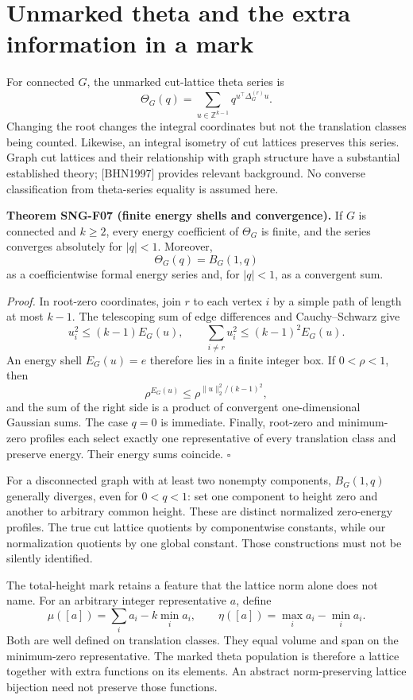 \documentclass[
  11pt,
  a4paper,
]{report}
\begin{document}
\hypertarget{unmarked-theta-and-the-extra-information-in-a-mark}{%
\section{Unmarked theta and the extra information in a
mark}\label{unmarked-theta-and-the-extra-information-in-a-mark}}

For connected \(G\), the unmarked cut-lattice theta series is \[
\Theta_G(q)=\sum_{u\in\mathbb Z^{k-1}}
q^{u^\top\Delta_G^{(r)}u}.
\] Changing the root changes the integral coordinates but not the
translation classes being counted. Likewise, an integral isometry of cut
lattices preserves this series. Graph cut lattices and their
relationship with graph structure have a substantial established theory;
{[}BHN1997{]} provides relevant background. No converse classification
from theta-series equality is assumed here.

\textbf{Theorem SNG-F07 (finite energy shells and convergence).} If
\(G\) is connected and \(k\ge2\), every energy coefficient of
\(\Theta_G\) is finite, and the series converges absolutely for
\(|q|<1\). Moreover, \[
\Theta_G(q)=B_G(1,q)
\] as a coefficientwise formal energy series and, for \(|q|<1\), as a
convergent sum.

\emph{Proof.} In root-zero coordinates, join \(r\) to each vertex \(i\)
by a simple path of length at most \(k-1\). The telescoping sum of edge
differences and Cauchy--Schwarz give \[
u_i^2\le(k-1)E_G(u),\qquad
\sum_{i\ne r}u_i^2\le(k-1)^2E_G(u).
\] An energy shell \(E_G(u)=e\) therefore lies in a finite integer box.
If \(0<\rho<1\), then \[
\rho^{E_G(u)}
\le\rho^{\|u\|_2^2/(k-1)^2},
\] and the sum of the right side is a product of convergent
one-dimensional Gaussian sums. The case \(q=0\) is immediate. Finally,
root-zero and minimum-zero profiles each select exactly one
representative of every translation class and preserve energy. Their
energy sums coincide. \(\square\)

For a disconnected graph with at least two nonempty components,
\(B_G(1,q)\) generally diverges, even for \(0<q<1\): set one component
to height zero and another to arbitrary common height. These are
distinct normalized zero-energy profiles. The true cut lattice quotients
by componentwise constants, while our normalization quotients by one
global constant. Those constructions must not be silently identified.

The total-height mark retains a feature that the lattice norm alone does
not name. For an arbitrary integer representative \(a\), define \[
\mu([a])=\sum_i a_i-k\min_i a_i,
\qquad
\eta([a])=\max_i a_i-\min_i a_i.
\] Both are well defined on translation classes. They equal volume and
span on the minimum-zero representative. The marked theta population is
therefore a lattice together with extra functions on its elements. An
abstract norm-preserving lattice bijection need not preserve those
functions.
\end{document}
